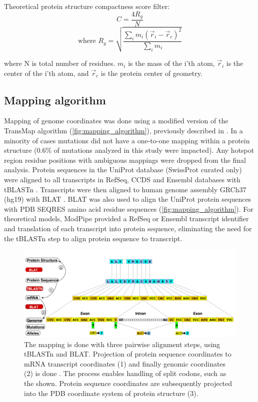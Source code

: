 Theoretical protein structure compactness score filter:
\begin{equation}
\label{eq:compactness}
C = \frac{4R_g}{N}
\end{equation}
\begin{equation}
\text{where } R_g=\sqrt{\frac{\sum_i{m_i(\vec{r}_i-\vec{r}_c)^2}}{\sum_i{m_i}}} 
\end{equation}

where N is total number of residues. $m_i$ is the mass of the i'th atom, $\vec{r}_i$ is the center of the i'th atom, and $\vec{r}_c$ is the protein center of geometry.

\subsection{Mapping algorithm}

Mapping of genome coordinates was done using a modified version of the TransMap algorithm (\autoref{fig:mapping_algorithm}), previously described in \cite{RN120}. In a minority of cases mutations did not have a one-to-one mapping within a protein structure (0.6\% of mutations analyzed in this study were impacted). Any hotspot region residue positions with ambiguous mappings were dropped from the final analysis. Protein sequences in the UniProt database (SwissProt curated only) \cite{RN121} were aligned to all transcripts in RefSeq, CCDS and Ensembl databases with tBLASTn \cite{RN122}.  Transcripts were then aligned to human genome assembly GRCh37 (hg19) with BLAT \cite{RN123}.  BLAT was also used to align the UniProt protein sequences with PDB SEQRES amino acid residue sequences (\autoref{fig:mapping_algorithm}).  For theoretical models, ModPipe provided a RefSeq or Ensembl transcript identifier and translation of each transcript into protein sequence, eliminating the need for the tBLASTn step to align protein sequence to transcript. 

\begin{figure}
  \centering
  \makeatletter
  \let\@currsize\normalsize
  \includegraphics[width=0.9\linewidth]{figures/chapter5/mapping_algorithm.png}
  \caption[Mapping of genomic coordinates onto protein structures and models with a modified version of the TransMap algorithm.]{The mapping is done with three pairwise alignment steps, using tBLASTn and BLAT.  Projection of protein sequence coordinates to mRNA transcript coordinates (1) and finally genomic coordinates (2) is done . The process enables handling of split codons, such as the  shown.  Protein sequence coordinates are subsequently projected into the PDB coordinate system of protein structure (3).}
  \label{fig:mapping_algorithm}
\end{figure}

